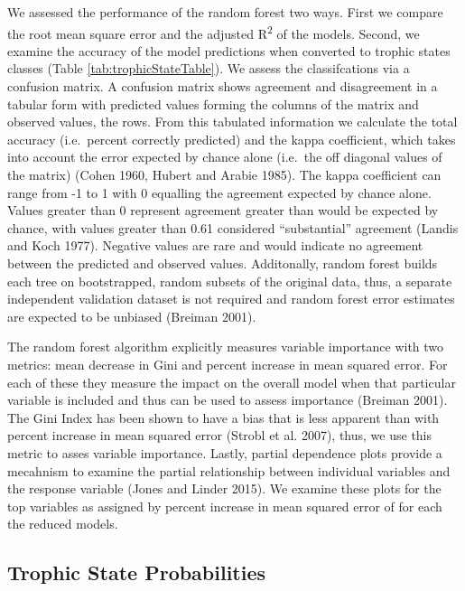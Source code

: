 \documentclass[11pt,]{article}
\begin{document}
We assessed the performance of the random forest two ways. First we
compare the root mean square error and the adjusted R\textsuperscript{2}
of the models. Second, we examine the accuracy of the model predictions
when converted to trophic states classes (Table
\ref{tab:trophicStateTable}). We assess the classifcations via a
confusion matrix. A confusion matrix shows agreement and disagreement in
a tabular form with predicted values forming the columns of the matrix
and observed values, the rows. From this tabulated information we
calculate the total accuracy (i.e.~percent correctly predicted) and the
kappa coefficient, which takes into account the error expected by chance
alone (i.e.~the off diagonal values of the matrix) (Cohen 1960, Hubert
and Arabie 1985). The kappa coefficient can range from -1 to 1 with 0
equalling the agreement expected by chance alone. Values greater than 0
represent agreement greater than would be expected by chance, with
values greater than 0.61 considered ``substantial'' agreement (Landis
and Koch 1977). Negative values are rare and would indicate no agreement
between the predicted and observed values. Additonally, random forest
builds each tree on bootstrapped, random subsets of the original data,
thus, a separate independent validation dataset is not required and
random forest error estimates are expected to be unbiased (Breiman
2001).

The random forest algorithm explicitly measures variable importance with
two metrics: mean decrease in Gini and percent increase in mean squared
error. For each of these they measure the impact on the overall model
when that particular variable is included and thus can be used to assess
importance (Breiman 2001). The Gini Index has been shown to have a bias
that is less apparent than with percent increase in mean squared error
(Strobl et al. 2007), thus, we use this metric to asses variable
importance. Lastly, partial dependence plots provide a mecahnism to
examine the partial relationship between individual variables and the
response variable (Jones and Linder 2015). We examine these plots for
the top variables as assigned by percent increase in mean squared error
of for each the reduced models.

\subsection{Trophic State
Probabilities}\label{trophic-state-probabilities}
\end{document}
